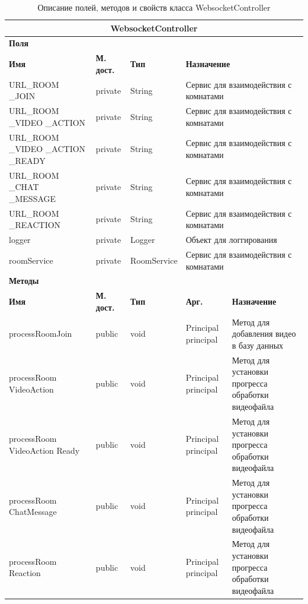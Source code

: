 \documentclass{../includes/TechDoc}
\begin{document}
    \begin{table}[h]
		\caption{\label{tab:class-AuthConfirmView-table}Описание полей, методов и свойств класса WebsocketController}
	    \begin{tabularx}{\textwidth}{|p{3.2cm}|l|l|l|X|}
	    	\hline
	  		\multicolumn{5}{|c|}{WebsocketController} \\ \hline
	  		\multicolumn{5}{|l|}{\textbf{Поля}} \\ \hline
	  		\textbf{Имя} & \textbf{М. дост.} & \textbf{Тип} & \multicolumn{2}{|l|}{\textbf{Назначение}} \\ \hline
	  		URL\_ROOM \_JOIN & private & String & \multicolumn{2}{|l|}{Сервис для взаимодействия с комнатами} \\ \hline
	  		URL\_ROOM \_VIDEO \_ACTION & private & String & \multicolumn{2}{|l|}{Сервис для взаимодействия с комнатами} \\ \hline
	  		URL\_ROOM \_VIDEO \_ACTION \_READY & private & String & \multicolumn{2}{|l|}{Сервис для взаимодействия с комнатами} \\ \hline
	  		URL\_ROOM \_CHAT \_MESSAGE & private & String & \multicolumn{2}{|l|}{Сервис для взаимодействия с комнатами} \\ \hline
	  		URL\_ROOM \_REACTION & private & String & \multicolumn{2}{|l|}{Сервис для взаимодействия с комнатами} \\ \hline
	  		logger & private & Logger & \multicolumn{2}{|l|}{Объект для логгирования} \\ \hline
	  		roomService & private & RoomService & \multicolumn{2}{|l|}{Сервис для взаимодействия с комнатами} \\ \hline
			\multicolumn{5}{|l|}{\textbf{Методы}} \\ \hline
			\textbf{Имя} & \textbf{М. дост.} & \textbf{Тип} & \textbf{Арг.} & \textbf{Назначение} \\ \hline
			processRoomJoin & public & void & Principal principal & Метод для добавления видео в базу данных \\ \hline
			processRoom VideoAction & public & void & Principal principal & Метод для установки прогресса обработки видеофайла \\ \hline
			processRoom VideoAction Ready & public & void & Principal principal & Метод для установки прогресса обработки видеофайла \\ \hline
			processRoom ChatMessage & public & void & Principal principal & Метод для установки прогресса обработки видеофайла \\ \hline
			processRoom Reaction & public & void & Principal principal & Метод для установки прогресса обработки видеофайла \\ \hline
		\end{tabularx}
    \end{table}
\end{document}
